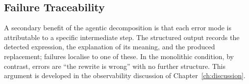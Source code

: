 \subsection{Failure Traceability}

A secondary benefit of the agentic decomposition is that each error mode is attributable to a specific intermediate step. The structured output records the detected expression, the explanation of its meaning, and the produced replacement; failures localise to one of these. In the monolithic condition, by contrast, errors are ``the rewrite is wrong'' with no further structure. This argument is developed in the observability discussion of Chapter~\ref{ch:discussion}.
